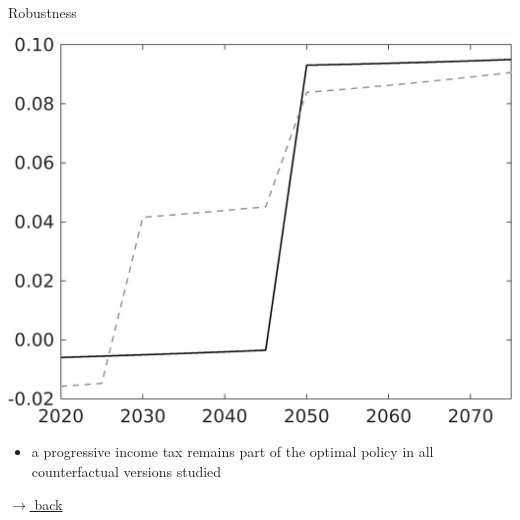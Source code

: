 \documentclass[11pt,aspectratio=169]{beamer}
\begin{document}
\begin{frame}{Robustness}
\begin{minipage}[]{0.3\textwidth}
	\end{minipage}
	\begin{minipage}[]{0.3\textwidth}
		\includegraphics[width=1\textwidth]{../codding_model/own_basedOnFried/optimalPol_elastS_DisuSci/figures/all_1705/SingleROB_countec_OPT_T_NoTaus_taul_spillover0_noskill0_sep1_BN0_ineq0_red0_etaa0.79_lgd0.png}
	\end{minipage}
	
	\vspace{6mm}
	\begin{itemize}
		\item a progressive income tax remains part of the optimal policy in all counterfactual versions studied	
	\end{itemize}
	\vspace{-1mm}
	\hfill
	\hyperlink{conc}{\tiny{$\rightarrow$ back}}
\end{frame}
\end{document}
